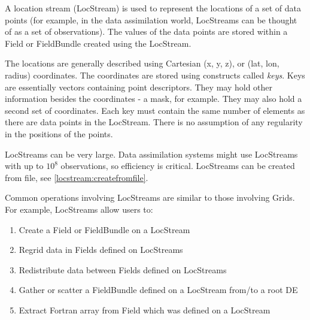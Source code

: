 %

A location stream (LocStream) is used to represent the locations of
a set of data points (for example, in the data assimilation world, 
LocStreams can be thought of as a set of observations).  The values 
of the data points are stored within a Field or FieldBundle created 
using the LocStream.

The locations are generally
described using Cartesian (x, y, z), or (lat, lon, radius) coordinates.
The coordinates are
stored using constructs called {\it keys}. Keys are essentially 
vectors containing point descriptors.  They may hold 
other information besides the coordinates - a mask, for example.  They 
may also hold a second 
set of coordinates.  Each key must contain the same number of elements 
as there are data points in the LocStream.
There is no assumption of any regularity in the positions of the points.

LocStreams can be very large. Data assimilation systems might use
LocStreams with up to $10^{8}$ observations, so efficiency is critical.
LocStreams can be created from file, see \ref{locstream:createfromfile}.

Common operations involving LocStreams are similar to those involving Grids.
For example, LocStreams allow users to:

\begin{enumerate}
\item Create a Field or FieldBundle on a LocStream
\item Regrid data in Fields defined on LocStreams
\item Redistribute data between Fields defined on LocStreams
\item Gather or scatter a FieldBundle defined on a LocStream from/to a root DE
\item Extract Fortran array from Field which was defined on a LocStream
\end{enumerate}




